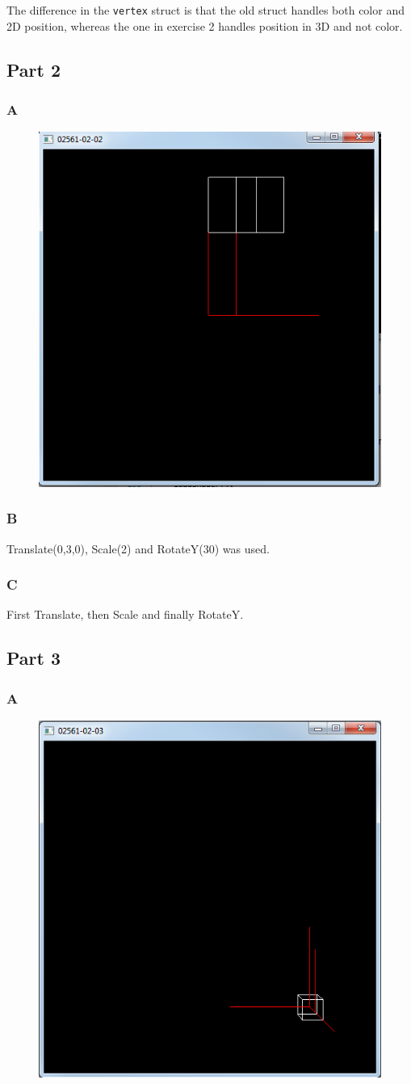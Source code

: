 \documentclass[11pt]{article}
\begin{document}
\noindent The difference in the \texttt{vertex} struct is that the old struct handles both color and 2D position, whereas the one in exercise 2 handles position in 3D and not color. 

\subsection{Part 2}
\subsubsection{A}
\begin{figure}[H]
	\centering
	\includegraphics[width=0.5\linewidth]{images/e02p2a}
	\label{fig:e02p2a}
\end{figure}

\subsubsection{B}
Translate(0,3,0), Scale(2) and RotateY(30) was used.

\subsubsection{C}
First Translate, then Scale and finally RotateY.


\subsection{Part 3}
\subsubsection{A}
\begin{figure}[H]
	\centering
	\includegraphics[width=0.5\linewidth]{images/e02p3a}
	\label{fig:e02p3a}
\end{figure}
\end{document}
